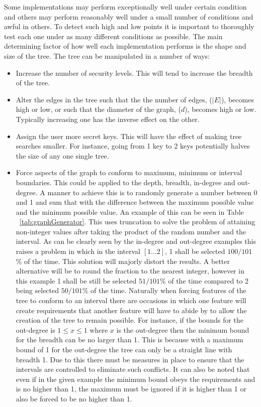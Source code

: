 \documentclass[10pt, titlepage]{article}
\begin{document}
Some implementations may perform exceptionally well under certain condition and others may perform reasonably well under a small number of conditions and awful in others. To detect such high and low points it is important to thoroughly test each one under as many different conditions as possible.
\newline \indent The main determining factor of how well each implementation performs is the shape and size of the tree. The tree can be manipulated in a number of ways:
\begin{itemize}
\item Increase the number of security levels. This will tend to increase the breadth of the tree.
\item Alter the edges in the tree such that the the number of edges, ($|E|$), becomes high or low, or such that the diameter of the graph, ($d$), becomes high or low. Typically increasing one has the inverse effect on the other. 
\item Assign the user more secret keys. This will have the effect of making tree searches smaller. For instance, going from 1 key to 2 keys potentially halves the size of any one single tree.
\item Force aspects of the graph to conform to maximum, minimum or interval boundaries. This could be applied to the depth, breadth, in-degree and out-degree. A manner to achieve this is to randomly generate a number between 0 and 1 and sum that with the difference between the maximum possible value and the minimum possible value. An example of this can be seen in Table ~\ref{tab:graphGenerator}. This uses truncation to solve the problem of attaining non-integer values after taking the product of the random number and the interval. As can be clearly seen by the in-degree and out-degree examples this raises a problem in which in the interval $[1 \dots 2]$, 1 shall be selected $100/101$\% of the time. This solution will majorly distort the results. A better alternative will be to round the fraction to the nearest integer, however in this example 1 shall be still be selected $51/101$\% of the time compared to 2 being selected $50/101$\% of the time.
\newline \indent Naturally when forcing features of the tree to conform to an interval there are occasions in which one feature will create requirements that another feature will have to abide by to allow the creation of the tree to remain possible. For instance, if the bounds for the out-degree is $1≤x≤1$ where $x$ is the out-degree then the minimum bound for the breadth can be no larger than 1. This is because with a maximum bound of 1 for the out-degree the tree can only be a straight line with breadth 1. Due to this there must be measures in place to ensure that the intervals are controlled to eliminate such conflicts. It can also be noted that even if in the given example the minimum bound obeys the requirements and is no higher than 1, the maximum must be ignored if it is higher than 1 or also be forced to be no higher than 1.
 
\end{itemize}
\end{document}
